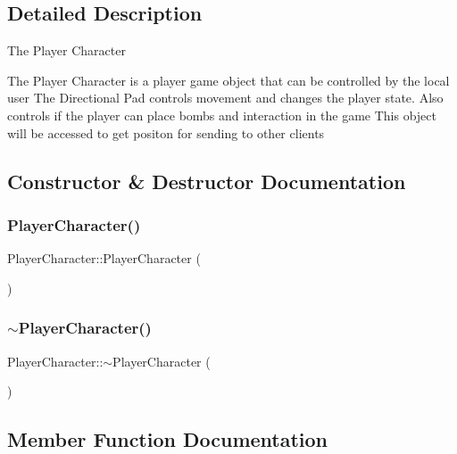 \subsection{Detailed Description}
The Player Character

The Player Character is a player game object that can be controlled by the local user The Directional Pad controls movement and changes the player state. Also controls if the player can place bombs and interaction in the game This object will be accessed to get positon for sending to other clients 

\subsection{Constructor \& Destructor Documentation}
\hypertarget{class_player_character_af3ac12a41f58d860fb716138578bd95f}{}\label{class_player_character_af3ac12a41f58d860fb716138578bd95f} 
\subsubsection{\texorpdfstring{Player\+Character()}{PlayerCharacter()}}
{\footnotesize\ttfamily Player\+Character\+::\+Player\+Character (\begin{DoxyParamCaption}{ }\end{DoxyParamCaption})}

\hypertarget{class_player_character_a4915330a9f743156b6860a97e6d68e28}{}\label{class_player_character_a4915330a9f743156b6860a97e6d68e28} 
\subsubsection{\texorpdfstring{$\sim$\+Player\+Character()}{~PlayerCharacter()}}
{\footnotesize\ttfamily Player\+Character\+::$\sim$\+Player\+Character (\begin{DoxyParamCaption}{ }\end{DoxyParamCaption})}



\subsection{Member Function Documentation}
\hypertarget{class_player_character_a19081e3c59bc962efb9c5e2c7887c267}{}\label{class_player_character_a19081e3c59bc962efb9c5e2c7887c267} 

